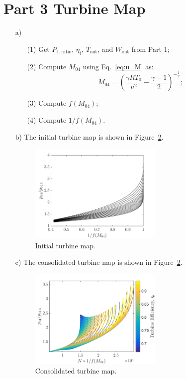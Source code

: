 \documentclass[12pt]{article}
\begin{document}
\section{Part 3 Turbine Map}		
\begin{itemize}
	\item[a)]
		\begin{itemize}
			\item[(1)] Get $P_\text{t, ratio}$, $\eta_\text{t}$, $T_\text{out}$, and $W_\text{out}$ from Part 1;
			\item[(2)] Compute $M_{04}$ using Eq.~\ref{eq:u_M} as:
				\begin{equation}
					M_{04} = \left(\frac{\gamma R T_0}{u^2} - \frac{\gamma - 1}{2} \right)^{-\frac{1}{2}};
				\end{equation}
			\item[(3)] Compute $f(M_{04})$;
			\item[(4)] Compute $1/f(M_{04})$.
		\end{itemize}

	\item[b)]
	The initial turbine map is shown in Figure~\ref{fig:p3b}.
	\begin{figure}[H]
		\centering
		\includegraphics[width=0.6\textwidth]{p3b}
		\caption{Initial turbine map.}
		\label{fig:p3b}
	\end{figure}
	
	\item[c)]
	The consolidated turbine map is shown in Figure~\ref{fig:p3b}.
	\begin{figure}[H]
		\centering
		\includegraphics[width=0.6\textwidth]{p3c}
		\caption{Consolidated turbine map.}
		\label{fig:p3b}
	\end{figure}
		
\end{itemize}
\end{document}
